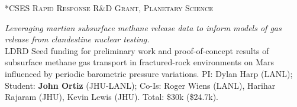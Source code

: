 \documentclass[11pt, letterpaper]{article}
\newcommand{\years}[1]{\marginnote{\scriptsize #1}}
\begin{document}
% 
% 
% 

\years{2020}\textsc{*CSES Rapid Response R\&D Grant, Planetary
Science}

    \textit{Leveraging martian subsurface methane release
    data to inform models of gas release from clandestine nuclear testing.}\\
	LDRD Seed funding for preliminary work and proof-of-concept results of
	subsurface methane gas transport in fractured-rock environments on Mars
	influenced by periodic barometric pressure variations.
    PI: Dylan Harp (LANL); Student: \textbf{John Ortiz} (JHU-LANL); Co-Is: Roger Wiens
    (LANL), Harihar Rajaram (JHU), Kevin Lewis (JHU). Total: \$30k (\$24.7k).
\end{document}
